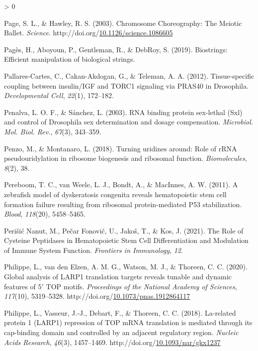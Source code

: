 \documentclass[12pt,oneside]{reedthesis}
\newlength{\cslhangindent}
\newenvironment{CSLReferences}[2] %
 {%
  \setlength{\parindent}{0pt}
  \ifodd #1 \everypar{\setlength{\hangindent}{\cslhangindent}}\ignorespaces\fi
  \ifnum #2 > 0
  \setlength{\parskip}{#2\baselineskip}
  \fi
 }%
 {}
\begin{document}
\begin{CSLReferences}{1}{0}
\leavevmode\hypertarget{ref-pageChromosomeChoreographyMeiotic2003}{}%
Page, S. L., \& Hawley, R. S. (2003). Chromosome {Choreography}: {The Meiotic Ballet}. \emph{Science}. http://doi.org/\href{https://doi.org/10.1126/science.1086605}{10.1126/science.1086605}

\leavevmode\hypertarget{ref-pagesBiostringsEfficientManipulation2019}{}%
Pagès, H., Aboyoun, P., Gentleman, R., \& DebRoy, S. (2019). Biostrings: {Efficient} manipulation of biological strings.

\leavevmode\hypertarget{ref-Pallares-Cartes2012a}{}%
Pallares-Cartes, C., Cakan-Akdogan, G., \& Teleman, A. A. (2012). Tissue-specific coupling between insulin/{IGF} and {TORC1} signaling via {PRAS40} in {Drosophila}. \emph{Developmental Cell}, \emph{22}(1), 172--182.

\leavevmode\hypertarget{ref-Penalva2003}{}%
Penalva, L. O. F., \& Sánchez, L. (2003). {RNA} binding protein sex-lethal ({Sxl}) and control of {Drosophila} sex determination and dosage compensation. \emph{Microbiol. Mol. Biol. Rev.}, \emph{67}(3), 343--359.

\leavevmode\hypertarget{ref-Penzo2018}{}%
Penzo, M., \& Montanaro, L. (2018). Turning uridines around: {Role} of {rRNA} pseudouridylation in ribosome biogenesis and ribosomal function. \emph{Biomolecules}, \emph{8}(2), 38.

\leavevmode\hypertarget{ref-Pereboom2011a}{}%
Pereboom, T. C., van Weele, L. J., Bondt, A., \& MacInnes, A. W. (2011). A zebrafish model of dyskeratosis congenita reveals hematopoietic stem cell formation failure resulting from ribosomal protein-mediated P53 stabilization. \emph{Blood}, \emph{118}(20), 5458--5465.

\leavevmode\hypertarget{ref-perisicnanutRoleCysteinePeptidases2021}{}%
Perišić Nanut, M., Pečar Fonović, U., Jakoš, T., \& Kos, J. (2021). The {Role} of {Cysteine Peptidases} in {Hematopoietic Stem Cell Differentiation} and {Modulation} of {Immune System Function}. \emph{Frontiers in Immunology}, \emph{12}.

\leavevmode\hypertarget{ref-philippeGlobalAnalysisLARP12020}{}%
Philippe, L., van den Elzen, A. M. G., Watson, M. J., \& Thoreen, C. C. (2020). Global analysis of {LARP1} translation targets reveals tunable and dynamic features of 5{\({'}\)} {TOP} motifs. \emph{Proceedings of the National Academy of Sciences}, \emph{117}(10), 5319--5328. http://doi.org/\href{https://doi.org/10.1073/pnas.1912864117}{10.1073/pnas.1912864117}

\leavevmode\hypertarget{ref-philippeLarelatedProteinLARP12018}{}%
Philippe, L., Vasseur, J.-J., Debart, F., \& Thoreen, C. C. (2018). La-related protein 1 ({LARP1}) repression of {TOP mRNA} translation is mediated through its cap-binding domain and controlled by an adjacent regulatory region. \emph{Nucleic Acids Research}, \emph{46}(3), 1457--1469. http://doi.org/\href{https://doi.org/10.1093/nar/gkx1237}{10.1093/nar/gkx1237}


\end{CSLReferences}
\end{document}
